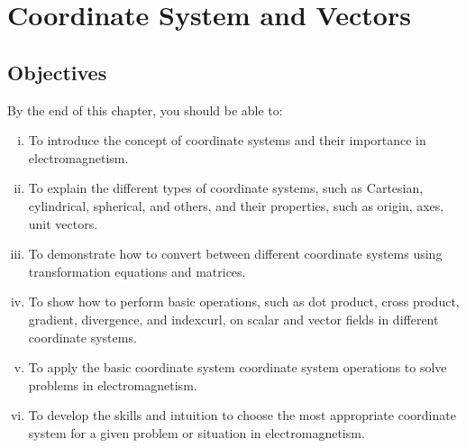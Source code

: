 \chapter{Coordinate System and Vectors}\label{lec:lec16}

\begin{mdframed}[ backgroundcolor=lightblue, linewidth=1pt, hidealllines=true]
\section{Objectives}
By the end of this chapter, you should be able to:
\begin{enumerate}[(i)]
\item   To introduce the concept of coordinate systems and their importance in electromagnetism. 
\item To explain the different types of coordinate systems, such as Cartesian, cylindrical, spherical, and others, and their properties, such as origin, axes, unit vectors.
\item To demonstrate how to convert between different coordinate systems using transformation equations and matrices.
\item To show how to perform basic operations, such as dot product, cross product, gradient, divergence, and index{curl}, on scalar and vector fields in different coordinate systems. 
\item To apply the basic coordinate system coordinate system operations to solve problems in electromagnetism.
\item To develop the skills and intuition to choose the most appropriate coordinate system for a given problem or situation in electromagnetism.
\end{enumerate}
\end{mdframed}

